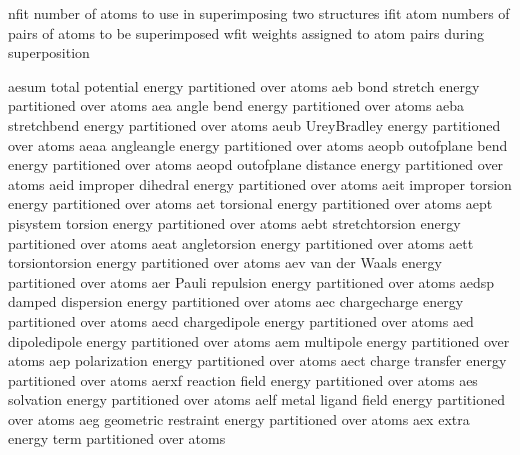 \documentclass[letterpaper,11pt,english]{sphinxmanual}
\begin{document}
\sphinxAtStartPar
{}

\begin{sphinxVerbatim}[commandchars=\\\{\}]
nfit            number of atoms to use in superimposing two structures
ifit            atom numbers of pairs of atoms to be superimposed
wfit            weights assigned to atom pairs during superposition
\end{sphinxVerbatim}

\sphinxAtStartPar
{}

\begin{sphinxVerbatim}[commandchars=\\\{\}]
aesum           total potential energy partitioned over atoms
aeb             bond stretch energy partitioned over atoms
aea             angle bend energy partitioned over atoms
aeba            stretch\PYGZhy{}bend energy partitioned over atoms
aeub            Urey\PYGZhy{}Bradley energy partitioned over atoms
aeaa            angle\PYGZhy{}angle energy partitioned over atoms
aeopb           out\PYGZhy{}of\PYGZhy{}plane bend energy partitioned over atoms
aeopd           out\PYGZhy{}of\PYGZhy{}plane distance energy partitioned over atoms
aeid            improper dihedral energy partitioned over atoms
aeit            improper torsion energy partitioned over atoms
aet             torsional energy partitioned over atoms
aept            pi\PYGZhy{}system torsion energy partitioned over atoms
aebt            stretch\PYGZhy{}torsion energy partitioned over atoms
aeat            angle\PYGZhy{}torsion energy partitioned over atoms
aett            torsion\PYGZhy{}torsion energy partitioned over atoms
aev             van der Waals energy partitioned over atoms
aer             Pauli repulsion energy partitioned over atoms
aedsp           damped dispersion energy partitioned over atoms
aec             charge\PYGZhy{}charge energy partitioned over atoms
aecd            charge\PYGZhy{}dipole energy partitioned over atoms
aed             dipole\PYGZhy{}dipole energy partitioned over atoms
aem             multipole energy partitioned over atoms
aep             polarization energy partitioned over atoms
aect            charge transfer energy partitioned over atoms
aerxf           reaction field energy partitioned over atoms
aes             solvation energy partitioned over atoms
aelf            metal ligand field energy partitioned over atoms
aeg             geometric restraint energy partitioned over atoms
aex             extra energy term partitioned over atoms
\end{sphinxVerbatim}
\end{document}

